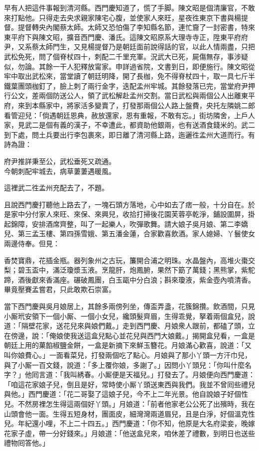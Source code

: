 早有人把這件事報到清河縣。西門慶知道了，慌了手脚。陳文昭是個清廉官，不敢來打點他。只得走去央求親家陳宅心腹，並使家人來旺，{}星夜徃東京下書與楊提督。提督轉央內閣蔡太師。太師又恐怕傷了李知縣名節，{}連忙齎了一封密書，特來東平府下與陳文昭，擴音西門慶、潘氏。這陳文昭原系大理寺寺正，陞東平府府尹，又系蔡太師門生，又見楊提督乃是朝廷面前說得話的官，以此人情兩盡，只把武松免死，問了個脊杖四十，刺配二千里充軍。況武大已死，屍傷無存，事涉疑似，勿論。其餘一干人犯釋放甯家。申詳過省院，文書到日，即便施行。陳文昭從牢中取出武松來，當堂讀了朝廷明降，開了長枷，免不得脊杖四十，取一具七斤半鐵葉團頭枷釘了，臉上刺了兩行金字，迭配孟州牢城。其餘發落已完，當堂府尹押行公文，差兩個防送公人，領了武松解赴孟州交割。當日武松與兩個公人出離東平府，來到本縣家中，將家活多變賣了，打發那兩個公人路上盤費，央托左隣姚二郎看管迎兒：「倘遇朝廷恩典，赦放還家，恩有重報，不敢有忘。」街坊隣舍，上戶人家，見武二是個有義的漢子，不幸遭此，都資助他銀兩，也有送酒食錢米的。武二到下處，問土兵要出行李包裹來，即日離了清河縣上路，迤邐徃孟州大道而行。有詩為證：

\begin{myquote}
府尹推詳秉至公，武松垂死又疏通。\\今朝刺配牢城去，病草萋萋遇暖風。
\end{myquote}

這裡武二徃孟州充配去了，不題。

且說西門慶打聽他上路去了，一塊石頭方落地，心中如去了痞一般，十分自在。於是家中分付家人來旺、來保、來興兒，收拾打掃後花園芙蓉亭乾淨，鋪設圍屏，掛起錦障，安排酒席齊整，叫了一起樂人，吹彈歌舞。請大娘子吳月娘、第二李嬌兒、第三孟玉樓、第四孫雪娥、第五潘金蓮，合家歡喜飲酒。家人媳婦、丫鬟使女兩邊侍奉。但見：

\begin{myquote}
香焚寶鼎，花插金瓶。器列象州之古玩，簾開合浦之明珠。水晶盤內，高堆火棗交梨；碧玉盃中，滿泛瓊漿玉液。烹龍肝，炮鳳腑，果然下筯了萬錢；黑熊掌，紫駝蹄，酒後獻來香滿座。碾破鳳團，白玉甌中分白浪；斟來瓊液，紫金壺內噴清香。畢竟壓賽孟嘗君，只此敢欺石崇富。
\end{myquote}

當下西門慶與吳月娘居上，其餘多兩傍列坐，傳盃弄盞，花簇錦攢。飲酒間，只見小厮玳安領下一個小厮、一個小女兒，纔頭髮齊眉，生得乖覺，拏着兩個盒兒，說道：「隔壁花家，送花兒來與娘們戴。」走到西門慶、月娘衆人跟前，都磕了頭，立在傍邊，說：「俺娘使我送這盒兒點心並花兒與西門大娘戴。」揭開盒兒看，一盒是朝廷上用的菓餡椒鹽金餅，一盒是新摘下來鮮玉簪花。月娘滿心歡喜，說道：「又叫你娘費心。」一面看菜兒，打發兩個吃了點心。月娘與了那小丫頭一方汗巾兒，與了小厮一百文錢，說道：「多上覆你娘，多謝了。」因問小丫頭兒：「你叫什麼名字？」他囘言道：「我叫綉春。小厮便是天福兒。」打發去了。月娘便向西門慶道：「咱這花家娘子兒，倒且是好，常時使小厮丫頭送東西與我們。我並不曾囘些禮兒與他。」西門慶道：「花二哥娶了這娘子兒，今不上二年光景。他自說娘子好個性兒。不然房裡怎生得這兩個好丫頭。」{}{}月娘道：「前者他家老公公死了出殯時，我在山頭會他一面。生得五短身材，團面皮，細灣灣兩道眉兒，且是白淨，好個溫克性兒。年紀還小哩，不上二十四五。」西門慶道：「你不知，他原是大名府梁妾，晚嫁花家子虛，帶一分好錢來。」月娘道：「他送盒兒來，咱休差了禮數，到明日也送些禮物囘答他。」

